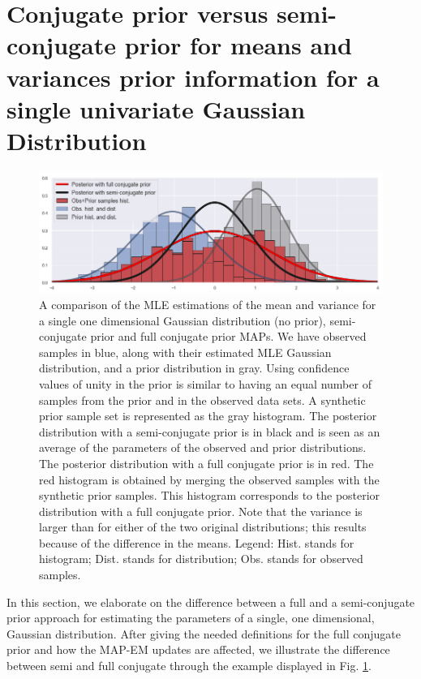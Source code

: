 \section{Conjugate prior versus semi-conjugate prior for means and variances prior information for a single univariate Gaussian Distribution}
\label{appendix:full_conjugate}

\begin{figure}
    \includegraphics[width=\textwidth]{./Fig/LowRes/Full_vs_Semi_conjugate.png}
    \caption{A comparison of the MLE estimations of the mean and variance for a single one dimensional Gaussian distribution (no prior), semi-conjugate prior and full conjugate prior MAPs. We have observed samples in blue, along with their estimated MLE Gaussian distribution, and a prior distribution in gray. Using confidence values of unity in the prior is similar to having an equal number of samples from the prior and in the observed data sets. A synthetic prior sample set is represented as the gray histogram. The posterior distribution with a semi-conjugate prior is in black and is seen as an average of the parameters of the observed and prior distributions. The posterior distribution with a full conjugate prior is in red. The red histogram is obtained by merging the observed samples with the synthetic prior samples. This histogram corresponds to the posterior distribution with a full conjugate prior. Note that the variance is larger than for either of the two original distributions; this results because of  the difference in the means. Legend: Hist. stands for histogram; Dist. stands for distribution; Obs. stands for observed samples.}
    \label{Full_vs_Semi_conjugate}
\end{figure}

In this section, we elaborate on the difference between a full and a semi-conjugate prior approach for estimating the parameters of a single, one dimensional, Gaussian distribution. After giving the needed definitions for the full conjugate prior and how the MAP-EM updates are affected, we illustrate the difference between semi and full conjugate through the example displayed in Fig. \ref{Full_vs_Semi_conjugate}.

